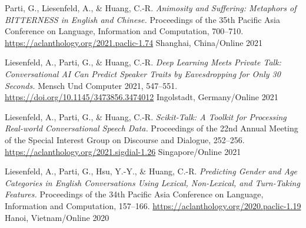 
\begin{cvhonors}

  \cvhonor
    {Parti, G., Liesenfeld, A., \& Huang, C.-R.} %
    {\textit{Animosity and Suffering: Metaphors of BITTERNESS in English and Chinese.} Proceedings of the 35th Pacific Asia Conference on Language, Information and Computation, 700–710. \url{https://aclanthology.org/2021.paclic-1.74}} %
    {Shanghai, China/Online} %
    {2021} %

  \cvhonor
    {Liesenfeld, A., Parti, G., \& Huang, C.-R.} %
    {\textit{Deep Learning Meets Private Talk: Conversational AI Can Predict Speaker Traits by Eavesdropping for Only 30 Seconds.} Mensch Und Computer 2021, 547–551. \url{https://doi.org/10.1145/3473856.3474012}} %
    {Ingolstadt, Germany/Online} %
    {2021} %

  \cvhonor
    {Liesenfeld, A., Parti, G., \& Huang, C.-R.} %
    {\textit{Scikit-Talk: A Toolkit for Processing Real-world Conversational Speech Data.} Proceedings of the 22nd Annual Meeting of the Special Interest Group on Discourse and Dialogue, 252–256. \url{https://aclanthology.org/2021.sigdial-1.26}} %
    {Singapore/Online} %
    {2021} %

\cvhonor
    {Liesenfeld, A., Parti, G., Hsu, Y.-Y., \& Huang, C.-R.} %
    {\textit{Predicting Gender and Age Categories in English Conversations Using Lexical, Non-Lexical, and Turn-Taking Features.} Proceedings of the 34th Pacific Asia Conference on Language, Information and Computation, 157–166. \url{https://aclanthology.org/2020.paclic-1.19}} %
    {Hanoi, Vietnam/Online} %
    {2020} %


\end{cvhonors}
